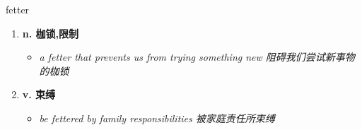 
\begin{frame}
{\huge fetter}
\begin{center}
\begin{enumerate}\Large
  \item \textbf{n. 枷锁,限制}
  \begin{itemize}
    \item \em{\Large{a fetter that prevents us from trying something new 阻碍我们尝试新事物的枷锁}}
  \end{itemize}
  \item \textbf{v. 束缚}
  \begin{itemize}
    \item \em{\Large{be fettered by family responsibilities 被家庭责任所束缚}}
  \end{itemize}
\end{enumerate}
\end{center}
\end{frame}

